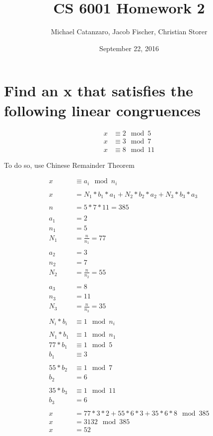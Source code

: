 \documentclass[letterpaper]{article}
\title{CS 6001 Homework 2}
\author{Michael Catanzaro, Jacob Fischer, Christian Storer}
\date{September 22, 2016}
\begin{document}
\maketitle

\section{Find an x that satisfies the following linear congruences}

\begin{equation*}
  \begin{split}
    x &\equiv 2\mod 5 \\
	  x &\equiv 3\mod 7 \\
    x &\equiv 8\mod 11
  \end{split}
\end{equation*}

To do so, use Chinese Remainder Theorem


\begin{equation*}
  \begin{split}
    x &\equiv a_i\mod n_i \\
    \\
    x &= N_1*b_1*a_1 + N_2*b_2*a_2 + N_3*b_3*a_3 \\
    \\
    n &= 5 * 7 * 11 = 385 \\
    \\
    a_1 &= 2 \\
    n_1 &= 5 \\
    N_1 &= \frac{n}{n_1} = 77 \\
    \\
    a_2 &= 3 \\
    n_2 &= 7 \\ 
    N_2 &= \frac{n}{n_2} = 55 \\
    \\
    a_3 &= 8 \\
    n_3 &= 11 \\
    N_3 &= \frac{n}{n_3} = 35 \\
    \\
    N_i*b_i &\equiv 1\mod n_i \\
    \\
    N_1*b_1 &\equiv 1\mod n_1 \\
    77*b_1 &\equiv 1\mod 5 \\
    b_1 &\equiv 3 \\
    \\
    55*b_2 &\equiv 1\mod 7 \\
    b_2 &= 6 \\
    \\
    35*b_3 &\equiv 1\mod 11 \\
    b_3 &= 6 \\
    \\
    x &= 77*3*2 + 55*6*3 + 35*6*8 \mod 385\\
    x &= 3132 \mod 385\\
    x &= 52
  \end{split}
\end{equation*}
\end{document}
